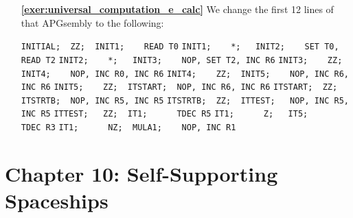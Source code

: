 \begin{multicols}{2}
\begin{itemize}[leftmargin=0em]
		\item[\bf\color{ocre}\sffamily\ref{exer:universal_computation_e_calc}] We change the first 12 lines of that APGsembly to the following:
		\begin{center}
			\noindent\begin{minipage}{\linewidth}
				\noindent\verb|INITIAL;  ZZ;  INIT1;    READ T0|
				\verb|INIT1;    *;   INIT2;    SET T0, READ T2|
				\verb|INIT2;    *;   INIT3;    NOP, SET T2, INC R6|
				\verb|INIT3;    ZZ;  INIT4;    NOP, INC R0, INC R6|
				\verb|INIT4;    ZZ;  INIT5;    NOP, INC R6, INC R6|
				\verb|INIT5;    ZZ;  ITSTART;  NOP, INC R6, INC R6|
				\verb|ITSTART;  ZZ;  ITSTRTB;  NOP, INC R5, INC R5|
				\verb|ITSTRTB;  ZZ;  ITTEST;   NOP, INC R5, INC R5|
				\verb|ITTEST;   ZZ;  IT1;      TDEC R5|
				\verb|IT1;      Z;   IT5;      TDEC R3|
				\verb|IT1;      NZ;  MULA1;    NOP, INC R1|
			\end{minipage}
		\end{center}
	\end{itemize}
\end{multicols}



\hypertarget{solutions_self_support_spaceships}{}\label{solutions_self_support_spaceships}
\section*{Chapter 10: Self-Supporting Spaceships}
\renewcommand{\chapterfolder}{self_support_spaceships/}

